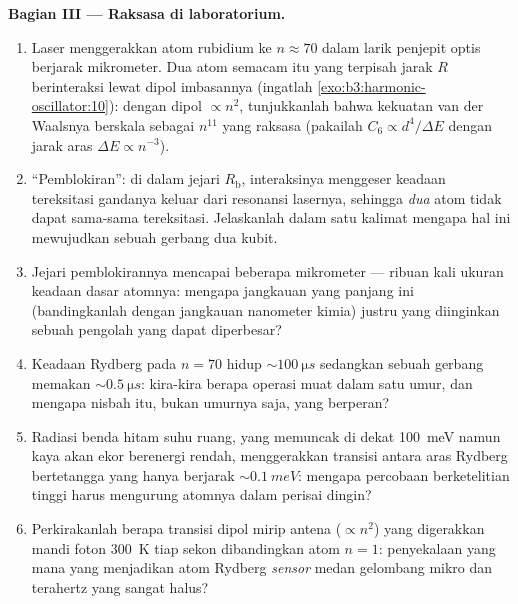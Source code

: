 \begin{problem}
\medskip\noindent\textbf{Bagian III --- Raksasa di laboratorium.}
\begin{enumerate}[resume]
  \item Laser menggerakkan atom rubidium ke $n \approx 70$ dalam larik
        penjepit optis berjarak mikrometer. Dua atom semacam itu yang
        terpisah jarak $R$ berinteraksi lewat dipol imbasannya
        (ingatlah \cref{exo:b3:harmonic-oscillator:10}): dengan dipol
        $\propto n^2$, tunjukkanlah bahwa kekuatan van der Waalsnya
        berskala sebagai $n^{11}$ yang raksasa (pakailah
        $C_6 \propto d^4/\Delta E$ dengan jarak aras $\Delta E \propto n^{-3}$).
  \item ``Pemblokiran'': di dalam jejari $R_{\text{b}}$, interaksinya
        menggeser keadaan tereksitasi gandanya keluar dari resonansi
        lasernya, sehingga \emph{dua} atom tidak dapat sama-sama
        tereksitasi. Jelaskanlah dalam satu kalimat mengapa hal ini
        mewujudkan sebuah gerbang dua kubit.
  \item Jejari pemblokirannya mencapai beberapa mikrometer --- ribuan
        kali ukuran keadaan dasar atomnya: mengapa jangkauan yang
        panjang ini (bandingkanlah dengan jangkauan nanometer kimia)
        justru yang diinginkan sebuah pengolah yang dapat diperbesar?
  \item Keadaan Rydberg pada $n = 70$ hidup $\sim\qty{100}{\micro s}$
        sedangkan sebuah gerbang memakan $\sim\qty{0.5}{\micro s}$:
        kira-kira berapa operasi muat dalam satu umur, dan mengapa
        nisbah itu, bukan umurnya saja, yang berperan?
  \item Radiasi benda hitam suhu ruang, yang memuncak di dekat
        \qty{100}{meV} namun kaya akan ekor berenergi rendah,
        menggerakkan transisi antara aras Rydberg bertetangga yang
        hanya berjarak $\sim\qty{0.1}{meV}$: mengapa percobaan
        berketelitian tinggi harus mengurung atomnya dalam perisai
        dingin?
  \item Perkirakanlah berapa transisi dipol mirip antena ($\propto n^2$)
        yang digerakkan mandi foton \qty{300}{K} tiap sekon
        dibandingkan atom $n = 1$: penyekalaan yang mana yang menjadikan
        atom Rydberg \emph{sensor} medan gelombang mikro dan terahertz
        yang sangat halus?
\end{enumerate}


\end{problem}
